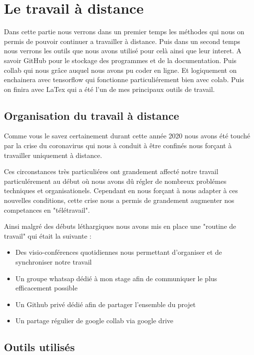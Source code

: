 
\hypertarget{Le-travail-a-distance}{%
\chapter{Le travail à distance}\label{Le-travail-a-distance}}

Dans cette partie nous verrons dans un premier temps les méthodes qui nous on permis de pouvoir continuer a travailler à distance. Puis dans un second temps nous verrons les outils que nous avons utilisé pour celà ainsi que leur interet. A savoir GitHub pour le stockage des programmes et de la documentation. Puis collab qui nous grâce auquel nous avons pu coder en ligne. Et logiquement on enchainera avec tensorflow qui fonctionne particuliérement bien avec colab. Puis on finira avec LaTex qui a été l'un de mes principaux outils de travail.

\hypertarget{Organisation-du-travail-a-distance}{%
\section{Organisation du travail à distance}\label{Organisation-du-travail-a-distance}}


Comme vous le savez certainement durant cette année 2020 nous avons été touché par la crise du coronavirus qui nous à conduit à être confinés nous forçant à travailler uniquement à distance.

Ces circonstances très particuliéres ont grandement affecté notre travail particulérement au début où nous avons dû régler de nombreux problémes techniques et organisationels. Cependant en nous forçant à nous adapter à ces nouvelles conditions, cette crise nous a permis de grandement augmenter nos competances en "télétravail".

Ainsi malgré des débuts léthargiques nous avons mis en place une "routine de travail" qui était la suivante :
\begin{itemize}
\item Des visio-conférences quotidiennes nous permettant d'organiser et de synchroniser notre travail
\item Un groupe whatsap dédié à mon stage afin de communiquer le plus efficacement possible
\item Un Github privé dédié afin de partager l'ensemble du projet
\item Un partage régulier de google collab via google drive
\end{itemize}

\hypertarget{Outils-utilisuxe9s}{%
\section{Outils utilisés}
\label{Outils-utilisuxe9s}}

